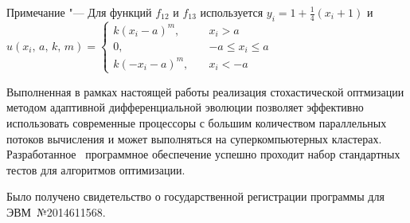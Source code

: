\begin{longtabu}
{            \hspace*{2.5em}%
            Примечание "---  Для функций $f_{12}$ и $f_{13}$
            используется $y_i = 1 + \frac{1}{4}(x_i+1)$ и
            $u(x_i,\,a,\,k,\,m)=\begin{cases}
k(x_i-a)^m,\quad &x_i >a\\[-0.5em]
0,\quad &-a\leq x_i \leq a\\[-0.5em]
k(-x_i-a)^m,\quad &x_i <-a
\end{cases}$  }   \\        \bottomrule %
\end{longtabu} \endgroup


Выполненная в рамках настоящей работы реализация стохастической
оптмизации методом адаптивной дифференциальной эволюции позволяет
эффективно использовать современные процессоры с большим количеством
параллельных потоков вычисления и может выполняться на
суперкомпьютерных кластерах.  Разработанное~\cite{JADE-web} программное обеспечение
успешно проходит набор стандартных тестов для алгоритмов оптимизации.

 Было получено
свидетельство о государственной регистрации программы для
ЭВМ~№2014611568.
\clearpage